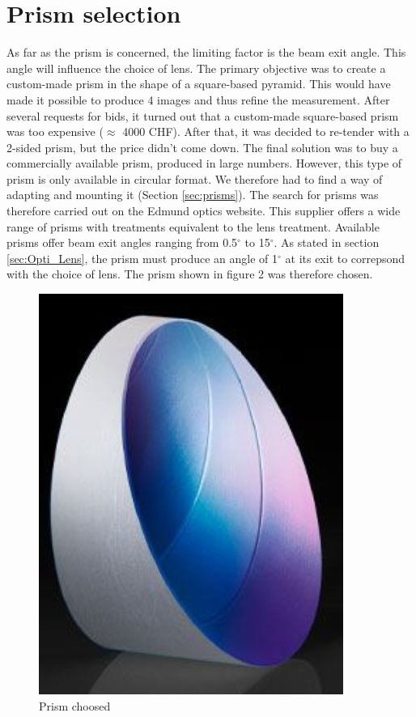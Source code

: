 \section{Prism selection}\label{sec:Opti_Prism}
As far as the prism is concerned, the limiting factor is the beam exit angle. This angle will influence the choice of lens.
\newline
The primary objective was to create a custom-made prism in the shape of a square-based pyramid. This would have made it
possible to produce 4 images and thus refine the measurement. After several requests for bids, it turned out that a custom-made
square-based prism was too expensive ($\approx$ 4000 CHF). After that, it was decided to re-tender with a 2-sided prism, but the price
didn't come down. The final solution was to buy a commercially available prism, produced in large numbers. However, this type of
prism is only available in circular format. We therefore had to find a way of adapting and mounting it (Section \ref{sec:prisms}).
\bigbreak
The search for prisms was therefore carried out on the Edmund optics website.
This supplier offers a wide range of prisms with treatments equivalent to the lens treatment.
Available prisms offer beam exit angles ranging from 0.5$^{\circ}$ to 15$^{\circ}$.
\newline
As stated in section \ref{sec:Opti_Lens}, the prism must produce an angle of 1$^{\circ}$ at its exit to correpsond with the
choice of lens. The prism shown in figure 2 was therefore chosen.
\begin{figure}[H]
    \centering
    \includegraphics[scale=0.8]{assets/figures/Mechanical Design/Prisme_obtenu.png}
    \caption{Prism choosed}
    \label{fig:Opti_Prism}
\end{figure}
